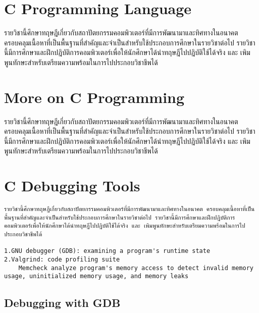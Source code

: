 \documentclass[
  notoc %
]{tufte-book}
\begin{document}
\hypertarget{sec:cprog}{%
\chapter{C Programming Language}\label{sec:cprog}}

รายวิชานี้ศึกษาทฤษฎีเกี่ยวกับสถาปัตยกรรมคอมพิวเตอร์ที่มีการพัฒนามาและทิศทางในอนาคต
ครอบคลุมเนื้อหาที่เป็นพื้นฐานที่สำคัญและจำเป็นสำหรับใช้ประกอบการศึกษาในรายวิชาต่อไป
รายวิชานี้มีการศึกษาและฝึกปฎิบัติการคอมพิวเตอร์เพื่อให้นักศึกษาได้นำทฤษฎีไปปฎิบัติใช้ได้จริง
และ เพิมพูนทักษะสำหรับเตรียมความพร้อมในการไปประกอบวิชาชีพได้

\hypertarget{sec:moreon_cprog}{%
\chapter{More on C Programming}\label{sec:moreon_cprog}}

รายวิชานี้ศึกษาทฤษฎีเกี่ยวกับสถาปัตยกรรมคอมพิวเตอร์ที่มีการพัฒนามาและทิศทางในอนาคต
ครอบคลุมเนื้อหาที่เป็นพื้นฐานที่สำคัญและจำเป็นสำหรับใช้ประกอบการศึกษาในรายวิชาต่อไป
รายวิชานี้มีการศึกษาและฝึกปฎิบัติการคอมพิวเตอร์เพื่อให้นักศึกษาได้นำทฤษฎีไปปฎิบัติใช้ได้จริง
และ เพิมพูนทักษะสำหรับเตรียมความพร้อมในการไปประกอบวิชาชีพได้

\hypertarget{sec:cdebuggingtools}{%
\chapter{C Debugging Tools}\label{sec:cdebuggingtools}}

\begin{lstlisting}
รายวิชานี้ศึกษาทฤษฎีเกี่ยวกับสถาปัตยกรรมคอมพิวเตอร์ที่มีการพัฒนามาและทิศทางในอนาคต ครอบคลุมเนื้อหาที่เป็นพื้นฐานที่สำคัญและจำเป็นสำหรับใช้ประกอบการศึกษาในรายวิชาต่อไป รายวิชานี้มีการศึกษาและฝึกปฎิบัติการคอมพิวเตอร์เพื่อให้นักศึกษาได้นำทฤษฎีไปปฎิบัติใช้ได้จริง และ เพิมพูนทักษะสำหรับเตรียมความพร้อมในการไปประกอบวิชาชีพได้

1.GNU debugger (GDB): examining a program's runtime state
2.Valgrind: code profiling suite
    Memcheck analyze program's memory access to detect invalid memory usage, uninitialized memory usage, and memory leaks
\end{lstlisting}

\hypertarget{sec:debugging-with-GDB}{%
\section{Debugging with GDB}\label{sec:debugging-with-GDB}}
\end{document}
